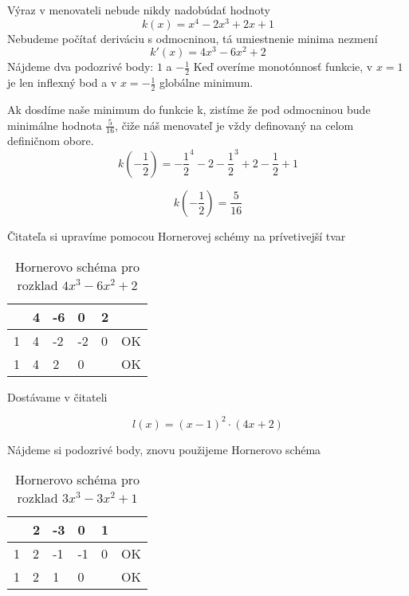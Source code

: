 Výraz v menovateli nebude nikdy nadobúdať hodnoty 
\begin{displaymath}
k(x)=x^4 -2x^3 + 2x + 1
\end{displaymath}
Nebudeme počítať deriváciu s odmocninou, tá umiestnenie minima nezmení
\begin{displaymath}
k'(x)=4x^3 -6x^2 + 2
\end{displaymath}
Nájdeme dva podozrivé body: $1$ a $-\frac{1}{2}$
Keď overíme monotónnosť funkcie, v $x=1$ je len inflexný bod a v $x=-\frac{1}{2}$ globálne minimum.

Ak dosdíme naše minimum do funkcie k, zistíme že pod odmocninou bude minimálne hodnota \(\frac{5}{16}\), čiže náš menovateľ je vždy definovaný na celom definičnom obore.
\begin{displaymath}
k(-\frac{1}{2})=-\frac{1}{2}^4 -2-\frac{1}{2}^3 + 2-\frac{1}{2} + 1
\end{displaymath}

\begin{displaymath}
k(-\frac{1}{2})=\frac{5}{16}
\end{displaymath}

Čitateľa si upravíme pomocou Hornerovej schémy na prívetivejší tvar

\begin{table}[!h]
\centering
\begin{tabular}{l||l|l|l|l|l}
	 & 4 & -6 &  0 & 2 &    \\ \hline\hline
   1 & 4 & -2 & -2 & 0 & OK \\ \hline
   1 & 4 &  2 &  0 &   & OK \\
\end{tabular}
\caption{Hornerovo schéma pro rozklad $4x^3 - 6x^2 + 2$}
\end{table}

Dostávame v čitateli

\begin{displaymath}
l(x)=(x-1)^2\cdot (4x +2)
\end{displaymath}

Nájdeme si podozrivé body, znovu použijeme Hornerovo schéma

\begin{table}[!h]
\centering
\begin{tabular}{l||l|l|l|l|l}
	 & 2 & -3 &  0 & 1 &    \\ \hline\hline
   1 & 2 & -1 & -1 & 0 & OK \\ \hline
   1 & 2 &  1 &  0 &   & OK \\
\end{tabular}
\caption{Hornerovo schéma pro rozklad $3x^3 - 3x^2 + 1$}
\end{table}

